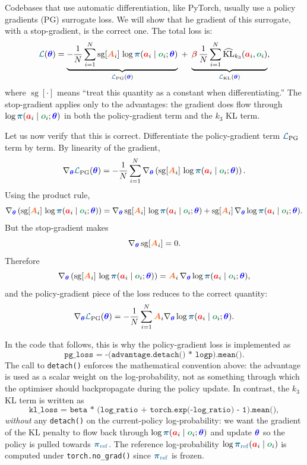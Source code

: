 \documentclass{article}
\newcommand{\colsym}[2]{\ensuremath{\textcolor{#1}{\boldsymbol{#2}}}}
\newcommand{\action}{\colsym{red}{a}}
\newcommand{\obs}{\colsym{ForestGreen}{o}}
\newcommand{\params}{\colsym{blue}{\theta}}
\newcommand{\policy}{\colsym{MidnightBlue}{\pi}}
\newcommand{\loss}{\ensuremath{\textcolor{MidnightBlue}{\mathcal{L}}}}
\newcommand{\advantage}{\colsym{Orange}{A}}
\newcommand{\refpolicy}{\ensuremath{\textcolor{MidnightBlue}{\boldsymbol{\pi}_{\mathrm{ref}}}}}
\newcommand{\klcoef}{\colsym{Mahogany}{\beta}}
\begin{document}
Codebases that use automatic differentiation, like PyTorch, usually use a policy gradients (PG) surrogate loss. We will show that he gradient of this surrogate, with a stop-gradient, is the correct one. The total loss is:
\[
\loss(\params)
=
\underbrace{
-
\frac{1}{N}\sum_{i=1}^{N}
\operatorname{sg}[\advantage_i]\,
\log \policy(\action_i\mid\obs_i;\params)
}_{\loss_{\mathrm{PG}}(\params)}
\;+\;
\underbrace{
\klcoef\,\frac{1}{N}\sum_{i=1}^{N}
\widehat{\mathrm{KL}}_{k_{3}}(\action_i,\obs_i)
}_{\loss_{\mathrm{KL}}(\params)},
\]
where \(\operatorname{sg}[\cdot]\) means ``treat this quantity as a constant when differentiating.'' The stop-gradient applies only to the advantages: the gradient does flow through \(\log\policy(\action_i\mid\obs_i;\params)\) in both the policy-gradient term and the $k_{3}$ KL term.

Let us now verify that this is correct. Differentiate the policy-gradient term \(\loss_{\mathrm{PG}}\) term by term. By linearity of the gradient,
\[
\nabla_{\params}\loss_{\mathrm{PG}}(\params)
=
-
\frac{1}{N}
\sum_{i=1}^{N}
\nabla_{\params}
\left(
\operatorname{sg}[\advantage_i]\,
\log \policy(\action_i\mid\obs_i;\params)
\right).
\]
Using the product rule,
\[
\nabla_{\params}
\left(
\operatorname{sg}[\advantage_i]\,
\log \policy(\action_i\mid\obs_i;\params)
\right)
=
\nabla_{\params}\operatorname{sg}[\advantage_i]\,
\log \policy(\action_i\mid\obs_i;\params)
+
\operatorname{sg}[\advantage_i]\,
\nabla_{\params}
\log \policy(\action_i\mid\obs_i;\params).
\]
But the stop-gradient makes
\[
\nabla_{\params}\operatorname{sg}[\advantage_i]=0.
\]
Therefore
\[
\nabla_{\params}
\left(
\operatorname{sg}[\advantage_i]\,
\log \policy(\action_i\mid\obs_i;\params)
\right)
=
\advantage_i\,
\nabla_{\params}
\log \policy(\action_i\mid\obs_i;\params),
\]
and the policy-gradient piece of the loss reduces to the correct quantity:
\[
\nabla_{\params}\loss_{\mathrm{PG}}(\params)
=
-
\frac{1}{N}
\sum_{i=1}^{N}
\advantage_i
\nabla_{\params}
\log \policy(\action_i\mid\obs_i;\params).
\]

In the code that follows, this is why the policy-gradient loss is implemented as
\[
\texttt{pg\_loss = -(advantage.detach() * logp).mean()}.
\]
The call to \texttt{detach()} enforces the mathematical convention above: the advantage is used as a scalar weight on the log-probability, not as something through which the optimiser should backpropagate during the policy update. In contrast, the $k_{3}$ KL term is written as
\[
\texttt{kl\_loss = beta * (log\_ratio + torch.exp(-log\_ratio) - 1).mean()},
\]
\emph{without} any \texttt{detach()} on the current-policy log-probability: we want the gradient of the KL penalty to flow back through \(\log\policy(\action_i\mid\obs_i;\params)\) and update \params{} so the policy is pulled towards \refpolicy. The reference log-probability \(\log\refpolicy(\action_i\mid\obs_i)\) is computed under \texttt{torch.no\_grad()} since \refpolicy{} is frozen.
\end{document}

